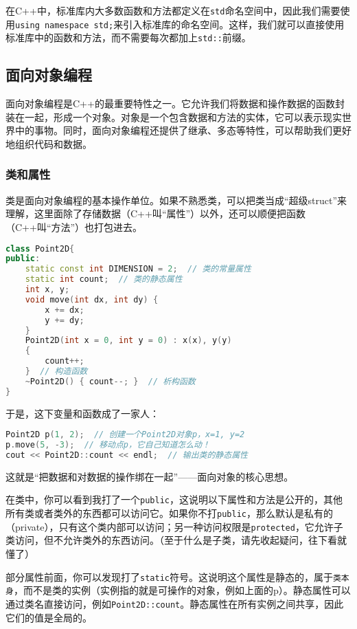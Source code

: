 \documentclass[../main.tex]{subfiles}
\begin{document}
在C++中，标准库内大多数函数和方法都定义在\texttt{std}命名空间中，因此我们需要使用\texttt{using namespace std;}来引入标准库的命名空间。这样，我们就可以直接使用标准库中的函数和方法，而不需要每次都加上\texttt{std::}前缀。

\subsection{面向对象编程}

面向对象编程是C++的最重要特性之一。它允许我们将数据和操作数据的函数封装在一起，形成一个对象。对象是一个包含数据和方法的实体，它可以表示现实世界中的事物。同时，面向对象编程还提供了继承、多态等特性，可以帮助我们更好地组织代码和数据。

\subsubsection{类和属性}

类是面向对象编程的基本操作单位。如果不熟悉类，可以把类当成“超级struct”来理解，这里面除了存储数据（C++叫“属性”）以外，还可以顺便把函数（C++叫“方法”）也打包进去。
\begin{lstlisting}[language=C++]
class Point2D{
public:
    static const int DIMENSION = 2;  // 类的常量属性
    static int count;  // 类的静态属性
    int x, y;
    void move(int dx, int dy) {
        x += dx;
        y += dy;
    }
    Point2D(int x = 0, int y = 0) : x(x), y(y)
    {
        count++;
    }  // 构造函数
    ~Point2D() { count--; }  // 析构函数
}
\end{lstlisting}
于是，这下变量和函数成了一家人：
\begin{lstlisting}[language=C++]
Point2D p(1, 2);  // 创建一个Point2D对象p，x=1, y=2
p.move(5, -3);  // 移动点p，它自己知道怎么动！
cout << Point2D::count << endl;  // 输出类的静态属性
\end{lstlisting}
这就是“把数据和对数据的操作绑在一起”——面向对象的核心思想。

在类中，你可以看到我打了一个\texttt{public}，这说明以下属性和方法是公开的，其他所有类或者类外的东西都可以访问它。如果你不打\texttt{public}，那么默认是私有的（private），只有这个类内部可以访问；另一种访问权限是\texttt{protected}，它允许子类访问，但不允许类外的东西访问。（至于什么是子类，请先收起疑问，往下看就懂了）

部分属性前面，你可以发现打了\texttt{static}符号。这说明这个属性是静态的，属于\texttt{类本身}，而不是类的实例（实例指的就是可操作的对象，例如上面的p）。静态属性可以通过类名直接访问，例如\texttt{Point2D::count}。静态属性在所有实例之间共享，因此它们的值是全局的。
\end{document}
